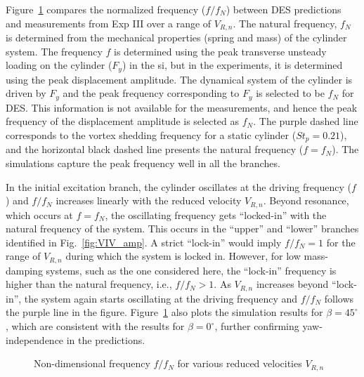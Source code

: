 Figure~\ref{fig:VIV_freq} compares the normalized frequency ($f/f_N$) between
DES predictions and measurements from Exp III over a range of $V_{R,n}$. The
natural frequency, $f_N$ is determined from the mechanical properties (spring
and mass) of the cylinder system. The frequency $f$ is determined using the
peak transverse unsteady loading on the cylinder ($F_y$) in the si, but in the
experiments, it is determined using the peak displacement amplitude. The
dynamical system of the cylinder is driven by $F_y$ and the peak frequency
corresponding to $F_y$ is selected to be $f_N$ for DES. This information is not
available for the measurements, and hence the peak frequency of the
displacement amplitude is selected as $f_N$. The purple dashed line corresponds
to the vortex shedding frequency for a static cylinder ($St_p=0.21$), and the
horizontal black dashed line presents the natural frequency ($f=f_N$). The
simulations capture the peak frequency well in all the branches. 

In the initial excitation branch, the cylinder oscillates at the driving
frequency ($f$) and $f/f_N$ increases linearly with the reduced velocity
$V_{R,n}$. Beyond resonance, which occurs at $f=f_N$, the oscillating frequency
gets ``locked-in'' with the natural frequency of the system. This occurs in the
``upper'' and ``lower'' branches identified in Fig.~\ref{fig:VIV_amp}. A strict
``lock-in'' would imply $f/f_N=1$ for the range of $V_{R,n}$ during which the
system is locked in. However, for low mass-damping systems, such as the one
considered here, the ``lock-in'' frequency is higher than the natural
frequency, i.e., $f/f_N>1$. As $V_{R,n}$ increases beyond ``lock-in'', the
system again starts oscillating at the driving frequency and $f/f_N$ follows
the purple line in the figure. Figure~\ref{fig:VIV_freq} also plots the
simulation results for $\beta=45^\circ$, which are consistent with the results
for $\beta=0^\circ$, further confirming yaw-independence in the predictions.
%
\begin{figure}[htb!]
  \caption{Non-dimensional frequency $f/f_N$ for various reduced velocities
    $V_{R,n}$}
  \label{fig:VIV_freq}
\end{figure}

